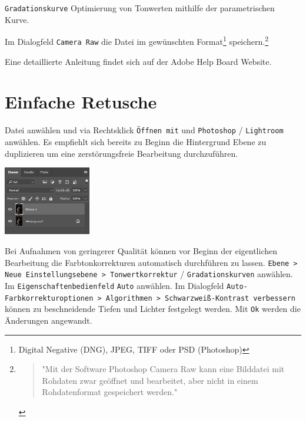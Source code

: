 \documentclass[notoc, landscape]{school}
\begin{document}
\begin{multicols}{2}
\begin{outline}[enumerate]
	\2 \texttt{Gradationskurve} Optimierung von Tonwerten mithilfe der parametrischen Kurve.

\1 Im Dialogfeld \texttt{Camera Raw} die Datei im gewünschten Format\footnote{Digital Negative (DNG), JPEG, TIFF oder PSD (Photoshop)} speichern.\footnote{\begin{quote}"Mit der Software Photoshop Camera Raw kann eine Bilddatei mit Rohdaten zwar geöffnet und bearbeitet, aber nicht in einem Rohdatenformat gespeichert werden."\end{quote}\cite{adobe-raw}}

Eine detaillierte Anleitung findet sich auf der Adobe Help Board Website\cite{adobe-raw}.
\end{outline}
\end{multicols}

\newpage
\section{Einfache Retusche}
\begin{minipage}{.65\textwidth}
\begin{outline}[enumerate]
\1 Datei anwählen und via Rechtsklick \texttt{Öffnen mit} und \texttt{Photoshop} / \texttt{Lightroom} anwählen.
\1 Es empfiehlt sich bereits zu Beginn die Hintergrund Ebene zu duplizieren um eine zerstörungsfreie Bearbeitung durchzuführen.
\begin{center}
\includegraphics[height=3cm]{retusche-01-ebene.png}
\end{center}
\1 Bei Aufnahmen von geringerer Qualität können vor Beginn der eigentlichen Bearbeitung die Farbtonkorrekturen automatisch durchführen zu lassen.
	\2 \texttt{Ebene > Neue Einstellungsebene > Tonwertkorrektur} / \texttt{Gradationskurven} anwählen.
	\2 Im \texttt{Eigenschaftenbedienfeld} \texttt{Auto} anwählen.
	\2 Im Dialogfeld \texttt{Auto-Farbkorrekturoptionen > Algorithmen > Schwarzweiß-Kontrast verbessern} können zu beschneidende Tiefen und Lichter festgelegt werden.
	\2 Mit \texttt{Ok} werden die Änderungen angewandt.
\end{outline}
\end{minipage}
\end{document}
